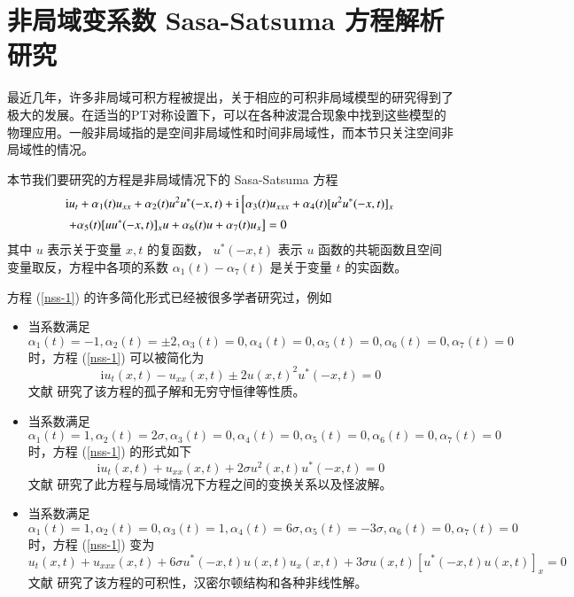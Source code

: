 \chapter{非局域变系数 Sasa-Satsuma 方程解析研究}
最近几年，许多非局域可积方程被提出，关于相应的可积非局域模型的研究得到了极大的发展。在适当的PT对称设置下，可以在各种波混合现象中找到这些模型的物理应用。一般非局域指的是空间非局域性和时间非局域性，而本节只关注空间非局域性的情况。

本节我们要研究的方程是非局域情况下的 Sasa-Satsuma 方程
\begin{align}
& \mathrm{i}u_{t} + \alpha_1(t) u_{xx} + \alpha_2(t)u^2u^*(-x,t) + \mathrm{i}\left[\alpha_3(t)u_{xxx} + \alpha_{4}(t)[u^{2}u^*(-x,t)]_{x}  \right. \notag\\
& \left. + \alpha_{5}(t)[uu^*(-x,t)]_{x}u + \alpha_{6}(t)u + \alpha_{7}(t)u_x\right] = 0 \label{nss-1}
\end{align}
其中 $u$ 表示关于变量 $x, t$ 的复函数， $u^*(-x,t)$ 表示 $u$ 函数的共轭函数且空间变量取反，方程中各项的系数 $\alpha_1(t) - \alpha_7(t)$ 是关于变量 $t$ 的实函数。

方程 (\ref{nss-1}) 的许多简化形式已经被很多学者研究过，例如
\begin{itemize}
  \item 当系数满足 $\alpha_1(t)=-1, \alpha_2(t)=\pm 2, \alpha_3(t)=0, \alpha_4(t)=0, \alpha_5(t)=0, \alpha_6(t) = 0, \alpha_7(t) = 0$ 时，方程 (\ref{nss-1}) 可以被简化为
      \begin{equation}
        \mathrm{i}u_t(x,t) - u_{xx}(x,t) \pm 2u(x,t)^2u^*(-x,t) = 0
      \end{equation}
      文献 \cite{nss-1} 研究了该方程的孤子解和无穷守恒律等性质。
  \item 当系数满足 $\alpha_1(t)=1, \alpha_2(t)=2\sigma, \alpha_3(t)=0, \alpha_4(t)=0, \alpha_5(t)=0, \alpha_6(t) = 0, \alpha_7(t)= 0$ 时，方程 (\ref{nss-1}) 的形式如下
      \begin{equation}
         \mathrm{i}u_t(x,t) + u_{xx}(x,t) + 2\sigma u^2(x,t)u^*(-x,t) = 0
      \end{equation}
      文献 \cite{nss-2} 研究了此方程与局域情况下方程之间的变换关系以及怪波解。
  \item 当系数满足 $\alpha_1(t)=1, \alpha_2(t)=0, \alpha_3(t)=1, \alpha_4(t)=6\sigma, \alpha_5(t)=-3\sigma, \alpha_6(t) = 0, \alpha_7(t) = 0$ 时，方程 (\ref{nss-1}) 变为
      \begin{equation}
        u_t(x,t) + u_{xxx}(x,t) + 6\sigma u^*(-x,t)u(x,t)u_x(x,t) + 3\sigma u(x,t)[u^*(-x,t)u(x,t)]_x = 0
      \end{equation}
      文献 \cite{nss-3} 研究了该方程的可积性，汉密尔顿结构和各种非线性解。
\end{itemize}

